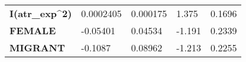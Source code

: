 \documentclass[]{article}
\begin{document}
\begin{longtable}[]{@{}lllll@{}}
\begin{minipage}[t]{0.23\columnwidth}
\textbf{I(atr\_exp\^{}2)}\strut
\end{minipage} & \begin{minipage}[t]{0.14\columnwidth}\raggedright
0.0002405\strut
\end{minipage} & \begin{minipage}[t]{0.16\columnwidth}\raggedright
0.000175\strut
\end{minipage} & \begin{minipage}[t]{0.12\columnwidth}\raggedright
1.375\strut
\end{minipage} & \begin{minipage}[t]{0.13\columnwidth}\raggedright
0.1696\strut
\end{minipage}\tabularnewline
\begin{minipage}[t]{0.23\columnwidth}\raggedright
\textbf{FEMALE}\strut
\end{minipage} & \begin{minipage}[t]{0.14\columnwidth}\raggedright
-0.05401\strut
\end{minipage} & \begin{minipage}[t]{0.16\columnwidth}\raggedright
0.04534\strut
\end{minipage} & \begin{minipage}[t]{0.12\columnwidth}\raggedright
-1.191\strut
\end{minipage} & \begin{minipage}[t]{0.13\columnwidth}\raggedright
0.2339\strut
\end{minipage}\tabularnewline
\begin{minipage}[t]{0.23\columnwidth}\raggedright
\textbf{MIGRANT}\strut
\end{minipage} & \begin{minipage}[t]{0.14\columnwidth}\raggedright
-0.1087\strut
\end{minipage} & \begin{minipage}[t]{0.16\columnwidth}\raggedright
0.08962\strut
\end{minipage} & \begin{minipage}[t]{0.12\columnwidth}\raggedright
-1.213\strut
\end{minipage} & \begin{minipage}[t]{0.13\columnwidth}\raggedright
0.2255\strut
\end{minipage}\tabularnewline
\bottomrule
\end{longtable}
\end{document}
